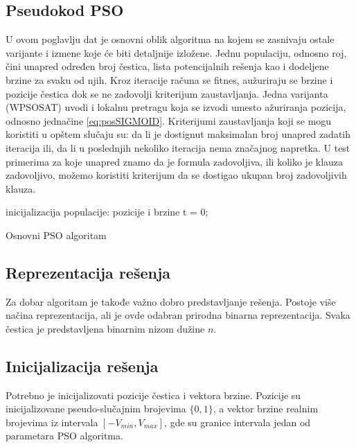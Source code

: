 \documentclass{article}
\begin{document}
\subsection{Pseudokod PSO}
U ovom poglavlju dat je osnovni oblik algoritma na kojem se zasnivaju ostale varijante i izmene koje će biti detaljnije izložene. Jednu populaciju, odnosno roj, čini unapred određen broj čestica, lista potencijalnih rešenja kao i dodeljene brzine za svaku od njih. 
Kroz iteracije računa se fitnes, aužuriraju se brzine i pozicije čestica dok se ne zadovolji kriterijum zaustavljanja. 
Jedna varijanta (WPSOSAT) uvodi i lokalnu pretragu koja se izvodi umesto ažuriranja pozicija, odnosno jednačine \ref{eq:posSIGMOID}.
Kriterijumi zaustavljanja koji se mogu koristiti u opštem slučaju su: da li je dostignut maksimalan broj unapred zadatih iteracija ili, da li u poslednjih nekoliko iteracija nema značajnog napretka.
U test primerima za koje unapred znamo da je formula zadovoljiva, ili koliko je klauza zadovoljivo, možemo koristiti kriterijum da se dostigao ukupan broj zadovoljivih klauza. \\

\begin{algorithm}[H]
\SetAlgoLined
{}

\BlankLine
 inicijalizacija populacije: pozicije i brzine\;
 t = 0; \\
\caption{Osnovni PSO algoritam}
\end{algorithm}


\subsection{Reprezentacija rešenja}
Za dobar algoritam je takođe važno dobro predstavljanje rešenja. Postoje više načina reprezentacija, ali je ovde odabran prirodna binarna reprezentacija. Svaka čestica je predstavljena binarnim nizom dužine $n$.


\subsection{Inicijalizacija rešenja}
Potrebno je inicijalizovati pozicije čestica i vektora brzine. Pozicije su inicijalizovane pseudo-slučajnim brojevima $\{0,1\}$, a vektor brzine realnim brojevima iz intervala $[-V_{min}, V_{max}]$, gde su granice intervala jedan od parametara PSO algoritma.
\end{document}
